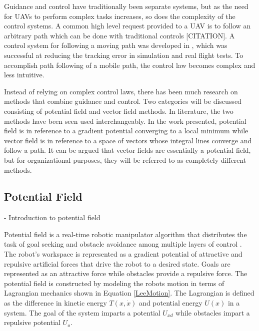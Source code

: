 \documentclass[numbered,pdftex]{ohio-etd}
\begin{document}
Guidance and control have traditionally been separate systems, but as the need for UAVs to perform complex tasks increases, so does the complexity of the control systems. A common high level request provided to a UAV is to follow an arbitrary path which can be done with traditional controls [CITATION]. A control system for following a moving path was developed in \cite{oliveira_moving_2016}, which was successful at reducing the tracking error in simulation and real flight tests. To accomplish path following of a mobile path, the control law becomes complex and less intuitive. 

Instead of relying on complex control laws, there has been much research on methods that combine guidance and control.  Two categories will be discussed consisting of potential field and vector field methods. In literature, the two methods have been seen used interchangeably. In the work presented, potential field is in reference to a gradient potential converging to a local minimum while vector field is in reference to a space of vectors whose integral lines converge and follow a path. It can be argued that vector fields are essentially a potential field, but for organizational purposes, they will be referred to as completely different methods. 
 
\subsection{Potential Field}
- {Introduction to potential field}

Potential field is a real-time robotic manipulator algorithm that distributes the task of goal seeking and obstacle avoidance among multiple layers of control \cite{khatib_real-time_1986}. The robot's workspace is represented as a gradient potential of attractive and repulsive artificial forces that drive the robot to a desired state. Goals are represented as an attractive force while obstacles provide a repulsive force. The potential field is constructed by modeling the robots motion in terms of Lagrangian mechanics shown in Equation \ref{LeeMotion}. The Lagrangian is defined as the difference in kinetic energy $T(x,\dot{x})$ and potential energy $U(x)$ in a system. The goal of the system imparts a potential $U_{xd}$ while obstacles impart a repulsive potential $U_o$. 
\end{document}
